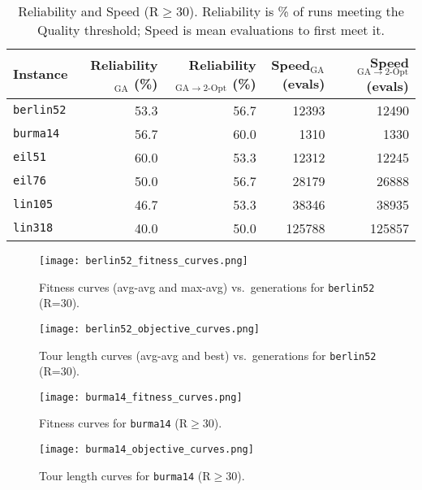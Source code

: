 \documentclass{article}
\begin{document}
\begin{table}[H] \centering \caption{Reliability and Speed (R$\ge$30). Reliability is \% of runs meeting the Quality threshold; Speed is mean evaluations to first meet it.} \label{tab:tsp_rel_speed} \begin{tabular}{lrrrr} \toprule Instance & Reliability$_\mathrm{GA}$ (\%) & Reliability$_{\mathrm{GA}\to\mathrm{2\text{-}Opt}}$ (\%) & Speed$_\mathrm{GA}$ (evals) & Speed$_{\mathrm{GA}\to\mathrm{2\text{-}Opt}}$ (evals) \\ \midrule \texttt{berlin52} & 53.3 & 56.7 & 12393 & 12490 \\ \texttt{burma14 } & 56.7 & 60.0 & 1310 & 1330 \\ \texttt{eil51 } & 60.0 & 53.3 & 12312 & 12245 \\ \texttt{eil76 } & 50.0 & 56.7 & 28179 & 26888 \\ \texttt{lin105 } & 46.7 & 53.3 & 38346 & 38935 \\ \texttt{lin318 } & 40.0 & 50.0 & 125788 & 125857 \\ \bottomrule \end{tabular} \end{table}

\begin{figure}[H]
    \centering
    \texttt{[image: berlin52\_fitness\_curves.png]}
    \caption{Fitness curves (avg-avg and max-avg) vs.\ generations for \texttt{berlin52} (R=30).}
\end{figure}

\begin{figure}[H]
    \centering
    \texttt{[image: berlin52\_objective\_curves.png]}
    \caption{Tour length curves (avg-avg and best) vs.\ generations for \texttt{berlin52} (R=30).}
\end{figure}

\clearpage

\begin{figure}[H]
    \centering
    \texttt{[image: burma14\_fitness\_curves.png]}
    \caption{Fitness curves for \texttt{burma14} (R$\ge$30).}
\end{figure}

\begin{figure}[H]
    \centering
    \texttt{[image: burma14\_objective\_curves.png]}
    \caption{Tour length curves for \texttt{burma14} (R$\ge$30).}
\end{figure}
\end{document}
